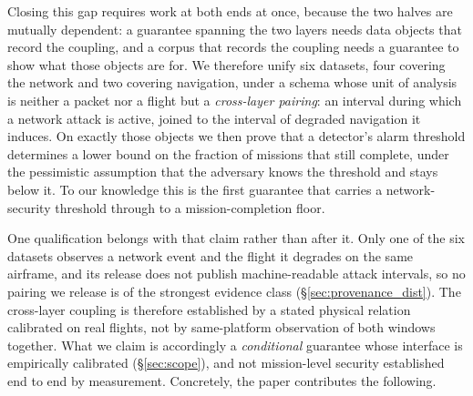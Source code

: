 Closing this gap requires work at both ends at once, because the two halves are
mutually dependent: a guarantee spanning the two layers needs data objects that
record the coupling, and a corpus that records the coupling needs a guarantee to
show what those objects are for. We therefore unify six datasets, four covering
the network and two covering navigation, under a schema whose unit of analysis
is neither a packet nor a flight but a \emph{cross-layer pairing}: an interval
during which a network attack is active, joined to the interval of degraded
navigation it induces. On exactly those objects we then prove that a detector's
alarm threshold determines a lower bound on the fraction of missions that still
complete, under the pessimistic assumption that the adversary knows the
threshold and stays below it. To our knowledge this is the first guarantee that
carries a network-security threshold through to a mission-completion floor.

One qualification belongs with that claim rather than after it. Only one of the
six datasets observes a network event and the flight it degrades on the same
airframe, and its release does not publish machine-readable attack intervals, so
no pairing we release is of the strongest evidence class
(\S\ref{sec:provenance_dist}). The cross-layer coupling is therefore established
by a stated physical relation calibrated on real flights, not by same-platform
observation of both windows together. What we claim is accordingly a
\emph{conditional} guarantee whose interface is empirically calibrated
(\S\ref{sec:scope}), and not mission-level security established end to end by
measurement. Concretely, the paper contributes the following.

